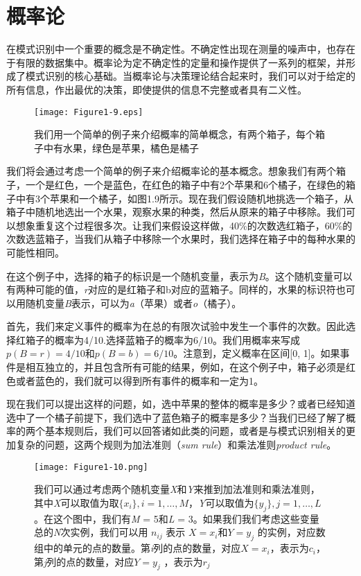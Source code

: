 {\color{blue} \section{概率论} }
	在模式识别中一个重要的概念是不确定性。不确定性出现在测量的噪声中，也存在于有限的数据集中。概率论为定不确定性的定量和操作提供了一系列的框架，并形成了模式识别的核心基础。当概率论与决策理论结合起来时，我们可以对于给定的所有信息，作出最优的决策，即使提供的信息不完整或者具有二义性。
	
	\begin{figure}[b]
		\parbox{.4\textwidth}{\caption{我们用一个简单的例子来介绍概率的简单概念，有两个箱子，每个箱子中有水果，绿色是苹果，橘色是橘子}}
		\parbox{.5\textwidth}{\texttt{[image: Figure1-9.eps]}}
	\end{figure}
	
	我们将会通过考虑一个简单的例子来介绍概率论的基本概念。想象我们有两个箱子，一个是红色，一个是蓝色，在红色的箱子中有2个苹果和6个橘子，在绿色的箱子中有3个苹果和一个橘子，如图1.9所示。现在我们假设随机地挑选一个箱子，从箱子中随机地选出一个水果，观察水果的种类，然后从原来的箱子中移除。我们可以想象重复这个过程很多次。让我们来假设这样做，40\%的次数选红箱子，60\%的次数选蓝箱子，当我们从箱子中移除一个水果时，我们选择在箱子中的每种水果的可能性相同。
	
	在这个例子中，选择的箱子的标识是一个随机变量，表示为\textit{B}。这个随机变量可以有两种可能的值，\textit{r}对应的是红箱子和b对应的蓝箱子。同样的，水果的标识符也可以用随机变量\textit{B}表示，可以为\textit{a}（苹果）或者\textit{o}（橘子）。
	
	首先，我们来定义事件的概率为在总的有限次试验中发生一个事件的次数。因此选择红箱子的概率为4/10.选择蓝箱子的概率为6/10。我们用概率来写成$p(B = r) = 4/10$和$p(B = b) = 6/10$。注意到，定义概率在区间[0, 1]。如果事件是相互独立的，并且包含所有可能的结果，例如，在这个例子中，箱子必须是红色或者蓝色的，我们就可以得到所有事件的概率和一定为1。
	
	现在我们可以提出这样的问题，如，选中苹果的整体的概率是多少？或者已经知道选中了一个橘子前提下，我们选中了蓝色箱子的概率是多少？当我们已经了解了概率的两个基本规则后，我们可以回答诸如此类的问题，或者是与模式识别相关的更加复杂的问题，这两个规则为加法准则（\textit{sum rule}）和乘法准则\textit{product rule}。

	\begin{figure}[t]
		\parbox{.6\textwidth}{\caption{ 我们可以通过考虑两个随机变量\textit{X}和\textit{Y}来推到加法准则和乘法准则，其中\textit{X}可以取值为取$ \{x_i \}, i = 1, \dots, M$，\textit{Y}可以取值为$ \{y_j \}, j = 1, \dots, L$。在这个图中，我们有\textit{M} = 5和\textit{L} = 3。如果我们我们考虑这些变量总的\textit{N}次实例，我们可以用 $n_{ij}$ 表示 $ X = x_i $和$ Y = y_j $ 的实例，对应数组中的单元的点的数量。第\textit{i}列的点的数量，对应$X = x_i$，表示为$c_i$，第\textit{j}列的点的数量，对应$Y = y_j$ ，表示为$r_j$ }}
		\parbox{.3\textwidth}{\texttt{[image: Figure1-10.png]}}
	\end{figure}
	
